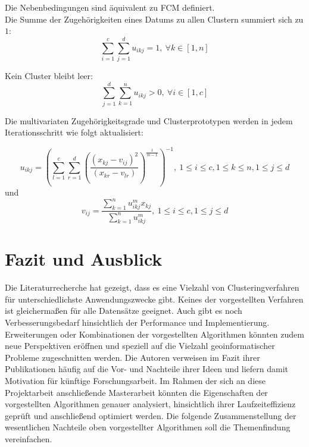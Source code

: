 \documentclass[11pt,ceqn]{book}
\begin{document}
Die Nebenbedingungen sind äquivalent zu FCM definiert.\\
Die Summe der Zugehörigkeiten eines Datums zu allen Clustern summiert sich zu $1$:
$$\sum_{i=1}^c\sum_{j=1}^d u_{ikj}= 1,\ \forall k\in \left[1,n\right]$$

Kein Cluster bleibt leer:
$$\sum_{j=1}^d\sum_{k=1}^n u_{ikj}> 0,\ \forall i\in \left[1,c\right]$$ 

Die multivariaten Zugehörigkeitsgrade und Clusterprototypen werden
in jedem Iterationsschritt wie folgt aktualisiert:

$$u_{ikj} = \left(\sum_{l=1}^c \sum_{r=1}^d \left(\frac{(x_{kj}-v_{ij})^2}{(x_{kr}-v_{lr})}\right)^{\frac{1}{m-1}}\right)^{-1},\ 1\leqslant i \leqslant c,1\leqslant k\leqslant n, 1\leqslant j\leqslant d$$
und
$$v_{ij} = \frac{\sum\limits_{k=1}^n u_{ikj}^m x_{kj}}{\sum\limits_{k=1}^n u_{ikj}^m},\ 1\leqslant i\leqslant c,1\leqslant j\leqslant d$$


\chapter{Fazit und Ausblick}

Die Literaturrecherche hat gezeigt, dass es eine Vielzahl von Clusteringverfahren für unterschiedlichste Anwendungszwecke gibt. Keines der vorgestellten Verfahren ist gleichermaßen für alle Datensätze geeignet. Auch gibt es noch Verbesserungsbedarf hinsichtlich der Performance und Implementierung. Erweiterungen oder Kombinationen der vorgestellten Algorithmen könnten zudem neue Perspektiven eröffnen und speziell auf die Vielzahl geoinformatischer Probleme zugeschnitten werden. Die Autoren verweisen im Fazit ihrer Publikationen häufig auf die Vor- und Nachteile ihrer Ideen und liefern damit Motivation für künftige Forschungsarbeit. Im Rahmen der sich an diese Projektarbeit anschließende Masterarbeit könnten die Eigenschaften der vorgestellten Algorithmen genauer analysiert, hinsichtlich ihrer Laufzeiteffizienz geprüft und anschließend optimiert werden. Die folgende Zusammenstellung der wesentlichen Nachteile oben vorgestellter Algorithmen soll die Themenfindung vereinfachen.\\~\\
\end{document}
